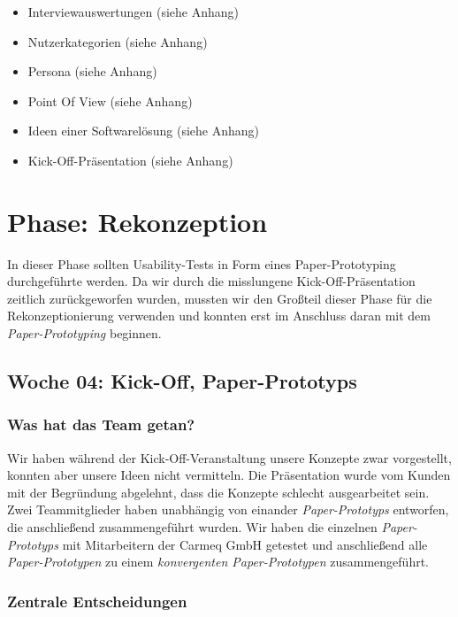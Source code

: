 \documentclass[12pt,a4paper]{article}
\begin{document}
\begin{itemize}
\item Interviewauswertungen (siehe Anhang)
\item Nutzerkategorien (siehe Anhang)
\item Persona (siehe Anhang)
\item Point Of View (siehe Anhang)
\item Ideen einer Softwarel\"osung (siehe Anhang)
\item Kick-Off-Pr\"asentation (siehe Anhang)
\end{itemize}



\section{Phase: Rekonzeption}

In dieser Phase sollten Usability-Tests in Form eines Paper-Prototyping durchgef\"uhrte werden. Da wir durch die misslungene Kick-Off-Pr\"asentation zeitlich zur\"uckgeworfen wurden, mussten wir den Gro\ss teil dieser Phase f\"ur die Rekonzeptionierung verwenden und konnten erst im Anschluss daran mit dem \textit{Paper-Prototyping} beginnen.

\subsection{Woche 04: Kick-Off, Paper-Prototyps}

\subsubsection{Was hat das Team getan?}

Wir haben w\"ahrend der Kick-Off-Veranstaltung unsere Konzepte zwar vorgestellt, konnten aber unsere Ideen nicht vermitteln. Die Pr\"asentation wurde vom Kunden mit der Begr\"undung abgelehnt, dass die Konzepte schlecht ausgearbeitet sein.\\
Zwei Teammitglieder haben unabh\"angig von einander \textit{Paper-Prototyps} entworfen, die anschlie\ss end zusammengef\"uhrt wurden. Wir haben die einzelnen \textit{Paper-Prototyps} mit Mitarbeitern der Carmeq GmbH getestet und anschlie\ss end alle \textit{Paper-Prototypen} zu einem \textit{konvergenten Paper-Prototypen} zusammengef\"uhrt.

\subsubsection{Zentrale Entscheidungen}
\end{document}
